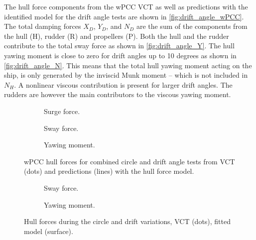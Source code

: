 The hull force components from the wPCC VCT as well as predictions with the identified model for the drift angle tests are shown in \autoref{fig:drift_angle_wPCC}. The total damping forces $X_D$, $Y_D$, and $N_D$ are the sum of the components from the hull (H), rudder (R) and propellers (P). Both the hull and the rudder contribute to the total sway force as shown in \autoref{fig:drift_angle_Y}. The hull yawing moment is close to zero for drift angles up to 10 degrees as shown in \autoref{fig:drift_angle_N}. This means that the total hull yawing moment acting on the ship, is only generated by the inviscid Munk moment -- which is not included in $N_H$. A nonlinear viscous contribution is present for larger drift angles. The rudders are however the main contributors to the viscous yawing moment.   
\begin{figure}[h]
     \centering
     \begin{subfigure}[b]{0.33\textwidth}
         \centering
         
        \caption{Surge force.}
        \label{fig:drift_angle_X}
     \end{subfigure}
     \hfill
     \begin{subfigure}[b]{0.33\textwidth}
         \centering
         
        \caption{Sway force.}
        \label{fig:drift_angle_Y}
     \end{subfigure}
     \hfill
     \begin{subfigure}[b]{0.33\textwidth}
         \centering
         
        \caption{Yawing moment.}
        \label{fig:drift_angle_N}
     \end{subfigure}
    \caption{wPCC hull forces for combined circle and drift angle tests from VCT (dots) and predictions (lines) with the hull force model.}
    \label{fig:drift_angle_wPCC}
\end{figure}
\begin{figure}[h]
     \centering
     \begin{subfigure}[b]{0.49\textwidth}
         \centering
         
        \caption{Sway force.}
        \label{fig:circle_drift_Y_H}
     \end{subfigure}
     \hfill
     \begin{subfigure}[b]{0.49\textwidth}
         \centering
         
        \caption{Yawing moment.}
        \label{fig:circle_drift_N_H}
     \end{subfigure}
    \caption{Hull forces during the circle and drift variations, VCT (dots), fitted model (surface).}
    \label{fig:circle_drift}
\end{figure}
